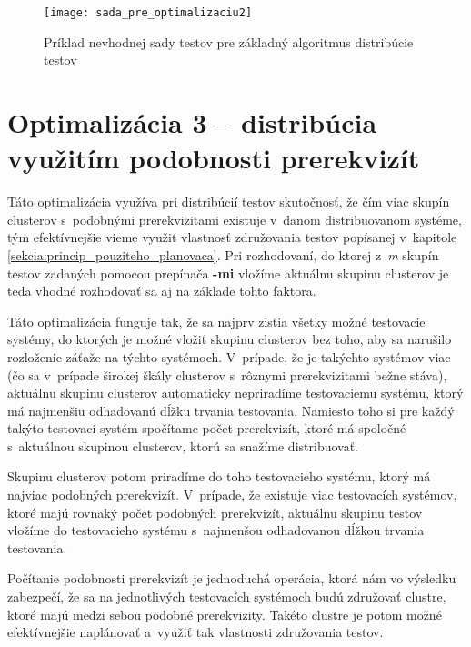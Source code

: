 \begin{figure}[h]
  \begin{center}
    \texttt{[image: sada\_pre\_optimalizaciu2]}
    \caption{Príklad nevhodnej sady testov pre základný algoritmus 
             distribúcie testov}
    \label{obrazok:sada_pre_optimalizaciu2}
  \end{center}
\end{figure}



\section{Optimalizácia 3 -- distribúcia využitím podobnosti prerekvizít}
\label{sekcia:optimalizacia3}
Táto optimalizácia využíva pri distribúcií testov skutočnosť, že čím viac
skupín clusterov s~podobnými prerekvizitami existuje v~danom 
distribuovanom systéme, tým efektívnejšie vieme využiť vlastnosť 
združovania testov popísanej v~kapitole 
\ref{sekcia:princip_pouziteho_planovaca}.
Pri rozhodovaní, do ktorej z~\textit{m} skupín testov zadaných pomocou 
prepínača \textbf{-mi} vložíme aktuálnu skupinu clusterov je teda vhodné 
rozhodovať sa aj na základe tohto faktora.

Táto optimalizácia funguje tak, že sa najprv zistia všetky možné 
testovacie systémy, do ktorých je možné vložiť skupinu clusterov bez toho, 
aby sa narušilo rozloženie záťaže na týchto systémoch. 
V~prípade, že je takýchto systémov viac (čo sa v~prípade širokej škály 
clusterov s~rôznymi prerekvizitami bežne stáva),
aktuálnu skupinu clusterov automaticky nepriradíme testovaciemu systému, 
ktorý má najmenšiu odhadovanú dĺžku trvania testovania. 
Namiesto toho si pre každý takýto testovací systém spočítame počet 
prerekvizít, ktoré má spoločné s~aktuálnou skupinou clusterov, ktorú 
sa snažíme distribuovať. 

Skupinu clusterov potom priradíme do toho testovacieho systému, ktorý 
má najviac podobných prerekvizít. V~prípade, že existuje viac 
testovacích systémov, ktoré majú rovnaký počet podobných prerekvizít, 
aktuálnu skupinu testov vložíme do testovacieho systému s~najmenšou
odhadovanou dĺžkou trvania testovania.

Počítanie podobnosti prerekvizít je jednoduchá operácia, ktorá nám vo 
výsledku zabezpečí, že sa na jednotlivých testovacích systémoch budú 
združovať clustre, ktoré majú medzi sebou podobné prerekvizity. 
Takéto clustre je potom možné efektívnejšie naplánovať a~využiť tak 
vlastnosti združovania testov.

